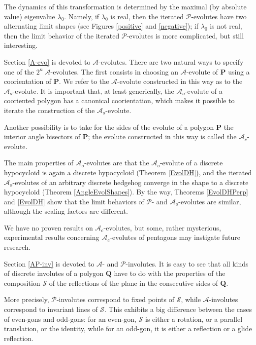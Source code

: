 \documentclass[12pt]{article}
\newcommand{\Pev}{\mathcal{P}}
\newcommand{\Aev}{\mathcal{A}}
\renewcommand{\P}{\mathbf{P}}
\begin{document}
The dynamics of this transformation is determined by the maximal (by absolute value) eigenvalue $\lambda_0$. Namely, if $\lambda_0$ is real, then the iterated $\Pev$-evolutes have two alternating limit shapes (see Figures \ref{positive} and \ref{negative}); if $\lambda_0$ is not real, then the limit behavior of the iterated $\Pev$-evolutes is more complicated, but still interesting.

Section \ref{A-evo} is devoted to $\Aev$-evolutes. There are two natural ways to specify one of the $2^n\ \Aev$-evolutes. The first  consists in choosing an $\Aev$-evolute of $\P$ using a coorientation of $\P$. We refer to the $\Aev$-evolute constructed in this way as to the $\Aev_o$-evolute. It is important that, at least generically, the $\Aev_o$-evolute of a cooriented polygon has a canonical coorientation, which makes it possible to iterate the construction of the $\Aev_o$-evolute. 

Another possibility is to take for the sides of the evolute of a polygon $\P$ the interior angle bisectors of $\P$; the evolute constructed in this way is called the $\Aev_c$-evolute.

The main properties of $\Aev_o$-evolutes are that the $\Aev_o$-evolute of a discrete hypocycloid is again a discrete hypocycloid (Theorem \ref{EvolDH}), and the iterated $\Aev_o$-evolutes of an arbitrary discrete hedgehog converge in the shape to a discrete hypocycloid (Theorem \ref{AngleEvolShapes}). By the way, Theorems \ref{EvolDHPerp} and \ref{EvolDH} show that the limit behaviors of $\Pev$- and $\Aev_o$-evolutes are similar, although the scaling factors are different.

We have no proven results on $\Aev_c$-evolutes, but some, rather mysterious, experimental results concerning $\Aev_c$-evolutes of pentagons may instigate future research.

Section \ref{AP-inv} is devoted to $\Aev$- and $\Pev$-involutes. It is easy to see that all kinds of discrete involutes of a polygon $\mathbf Q$ have to do with the properties of the composition $\mathcal S$ of the reflections of the plane in the consecutive sides of $\mathbf Q$. 

More precisely, $\Pev$-involutes correspond to fixed points of $\mathcal S$, while $\Aev$-involutes correspond to invariant lines of $\mathcal S$. This exhibits a big difference between the cases of even-gons and odd-gons: for an even-gon, $\mathcal S$ is either a rotation, or a parallel translation, or the identity, while for an odd-gon, it is either a reflection or a glide reflection. 
\end{document}
